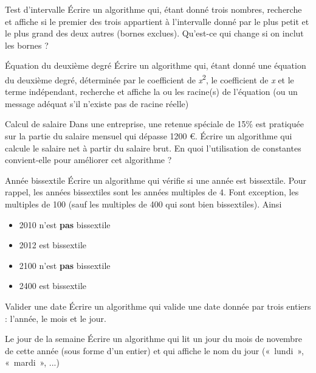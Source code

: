 \begin{Exercice}{Test d'intervalle}
{
Écrire un algorithme qui, étant donné trois nombres, recherche et
affiche si le premier des trois appartient à l’intervalle donné par le
plus petit et le plus grand des deux autres (bornes exclues). Qu’est-ce
qui change si on inclut les bornes ?}
\end{Exercice}

\begin{Exercice}{Équation du deuxième degré}
{
{Écrire un algorithme qui, étant donné une
équation du deuxième degré, déterminée par le coefficient de
}{\textit{x}}{\textsuperscript{2}}{,
le coefficient de
}{\textit{x}}{ et le
terme indépendant, recherche et affiche la ou les racine(s) de
l’équation (ou un message adéquat s'il
n'existe pas de racine réelle) }}
\end{Exercice}

\begin{Exercice}{Calcul de salaire}
{
Dans une entreprise, une retenue spéciale de 15\% est pratiquée sur la
partie du salaire mensuel qui dépasse 1200 €. Écrire un algorithme qui
calcule le salaire net à partir du salaire brut. En quoi l’utilisation
de constantes convient-elle pour améliorer cet algorithme ?}
\end{Exercice}

\begin{Exercice}{Année bissextile}
Écrire un algorithme qui vérifie si une année est bissextile. Pour
rappel, les années bissextiles sont les années multiples de 4. Font
exception, les multiples de 100 (sauf les multiples de 400 qui sont
bien bissextiles). Ainsi

\begin{itemize}
\item {
2010 n'est \textbf{pas} bissextile}
\item {
2012 est bissextile}
\item {
2100 n'est \textbf{pas} bissextile}
\item {
2400 est bissextile}
\end{itemize}

\end{Exercice}

\begin{Exercice}{Valider une date}
{
Écrire un algorithme qui valide une date donnée par trois entiers :
l’année, le mois et le jour.}
\end{Exercice}

\begin{Exercice}{Le jour de la semaine}
{
Écrire un algorithme qui lit un jour du mois de novembre de cette année
(sous forme d'un entier) et qui affiche le nom du jour
(«~lundi~», «~mardi~», ...)}
\end{Exercice}

